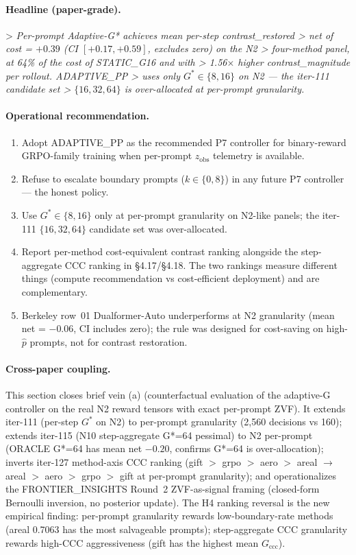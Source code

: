 \documentclass{article}
\begin{document}
\paragraph{Headline (paper-grade).}

> \emph{Per-prompt Adaptive-G* achieves mean per-step contrast\_restored
> net of cost = $+0.39$ (CI $[+0.17, +0.59]$, excludes zero) on the N2
> four-method panel, at 64\% of the cost of STATIC\_G16 and with
> 1.56$\times$ higher contrast\_magnitude per rollout. ADAPTIVE\_PP
> uses only $G^* \in \{8, 16\}$ on N2 — the iter-111 candidate set
> $\{16, 32, 64\}$ is over-allocated at per-prompt granularity.}

\paragraph{Operational recommendation.}

\begin{enumerate}
\item Adopt ADAPTIVE\_PP as the recommended P7 controller for binary-reward
      GRPO-family training when per-prompt $z_{\mathrm{obs}}$ telemetry
      is available.
\item Refuse to escalate boundary prompts ($k \in \{0, 8\}$) in any future
      P7 controller — the honest policy.
\item Use $G^* \in \{8, 16\}$ only at per-prompt granularity on N2-like
      panels; the iter-111 $\{16, 32, 64\}$ candidate set was over-allocated.
\item Report per-method cost-equivalent contrast ranking alongside the
      step-aggregate CCC ranking in §4.17/§4.18. The two rankings measure
      different things (compute recommendation vs cost-efficient
      deployment) and are complementary.
\item Berkeley row~01 Dualformer-Auto underperforms at N2 granularity
      (mean net = $-0.06$, CI includes zero); the rule was designed for
      cost-saving on high-$\hat{p}$ prompts, not for contrast restoration.
\end{enumerate}

\paragraph{Cross-paper coupling.}

This section closes brief vein (a) (counterfactual evaluation of the
adaptive-G controller on the real N2 reward tensors with exact per-prompt
ZVF). It extends iter-111 (per-step $G^*$ on N2) to per-prompt granularity
(2,560 decisions vs 160); extends iter-115 (N10 step-aggregate G*=64
pessimal) to N2 per-prompt (ORACLE G*=64 has mean net $-0.20$, confirms
G*=64 is over-allocation); inverts iter-127 method-axis CCC ranking
(gift $>$ grpo $>$ aero $>$ areal $\to$ areal $>$ aero $>$ grpo $>$ gift at
per-prompt granularity); and operationalizes the FRONTIER\_INSIGHTS Round~2
ZVF-as-signal framing (closed-form Bernoulli inversion, no posterior
update). The H4 ranking reversal is the new empirical finding: per-prompt
granularity rewards low-boundary-rate methods (areal 0.7063 has the most
salvageable prompts); step-aggregate CCC granularity rewards high-CCC
aggressiveness (gift has the highest mean $G_{\mathrm{ccc}}$). 
\end{document}
